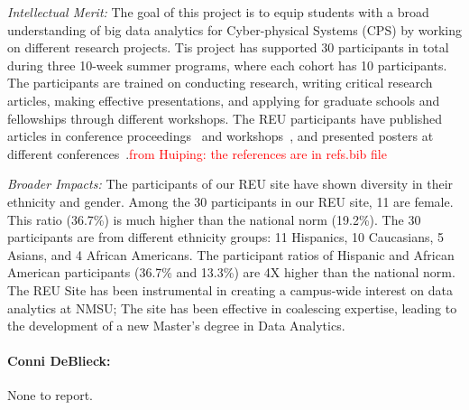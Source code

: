 
\noindent\textit{Intellectual Merit:} 
The goal of this project is to equip students with a broad understanding of big data analytics for Cyber-physical Systems (CPS) by working on different research projects. Tis project has supported 30 participants in total during three 10-week summer programs, where each cohort has 10 participants. The participants are trained on conducting research, writing critical research articles, making effective presentations, and applying for graduate schools and fellowships through different workshops. 
The REU participants have published articles in conference proceedings~\cite{reu2,reu3} and workshops~\cite{reu1,reu7}, and presented posters at different conferences~\cite{reu4,reu5,reu6,reu10}.\textcolor{red}{from Huiping: the references are in refs.bib file}


\noindent\textit{Broader Impacts:} 
The participants of our REU site have shown diversity in their ethnicity and gender.
Among the 30 participants in our REU site, 11 are female. 
This ratio (36.7\%) is much higher than the national norm (19.2\%). 
%
The 30 participants are from different ethnicity groups: 11 Hispanics, 10 Caucasians,  5 Asians, and 4 African Americans.  The participant ratios of  Hispanic and African American participants  (36.7\% and 13.3\%) are 4X higher than the national norm. The REU Site has been instrumental in creating a campus-wide interest on data analytics at NMSU; The site has  been effective in coalescing expertise, leading to  the development of a new Master's degree in Data Analytics.

\paragraph{Conni DeBlieck:} None to report.

